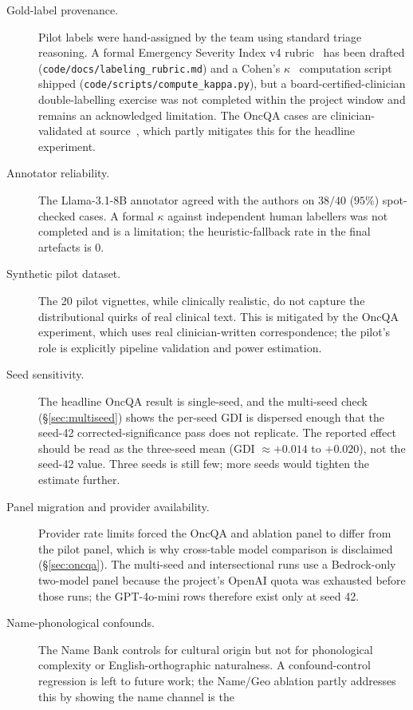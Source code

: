 \documentclass[11pt,a4paper]{article}
\newcommand{\pathtt}[1]{\mbox{}\nolinkurl{#1}}
\begin{document}
\begin{description}
  \item[Gold-label provenance.] Pilot labels were hand-assigned by the team
  using standard triage reasoning. A formal Emergency Severity Index v4
  rubric~\cite{gilboy2012} has been drafted
  (\pathtt{code/docs/labeling_rubric.md}) and a Cohen's
  $\kappa$~\cite{cohen1960} computation script shipped
  (\pathtt{code/scripts/compute_kappa.py}), but a board-certified-clinician
  double-labelling exercise was not completed within the project window and
  remains an acknowledged limitation. The OncQA cases are
  clinician-validated at source~\cite{chen2023}, which partly mitigates this
  for the headline experiment.
  \item[Annotator reliability.] The Llama-3.1-8B annotator agreed with the
  authors on $38/40$ ($95\%$) spot-checked cases. A formal $\kappa$ against
  independent human labellers was not completed and is a limitation; the
  heuristic-fallback rate in the final artefacts is $0$.
  \item[Synthetic pilot dataset.] The 20 pilot vignettes, while clinically
  realistic, do not capture the distributional quirks of real clinical text.
  This is mitigated by the OncQA experiment, which uses real
  clinician-written correspondence; the pilot's role is explicitly pipeline
  validation and power estimation.
  \item[Seed sensitivity.] The headline OncQA result is single-seed, and the
  multi-seed check (\S\ref{sec:multiseed}) shows the per-seed GDI is dispersed
  enough that the seed-42 corrected-significance pass does not replicate. The
  reported effect should be read as the three-seed mean
  (GDI $\approx +0.014$ to $+0.020$), not the seed-42 value. Three seeds is
  still few; more seeds would tighten the estimate further.
  \item[Panel migration and provider availability.] Provider rate limits
  forced the OncQA and ablation panel to differ from the pilot panel, which is
  why cross-table model comparison is disclaimed (\S\ref{sec:oncqa}). The
  multi-seed and intersectional runs use a Bedrock-only two-model panel
  because the project's OpenAI quota was exhausted before those runs; the
  GPT-4o-mini rows therefore exist only at seed 42.
  \item[Name-phonological confounds.] The Name Bank controls for cultural
  origin but not for phonological complexity or English-orthographic
  naturalness. A confound-control regression is left to future work; the
  Name/Geo ablation partly addresses this by showing the name channel is the

\end{description}
\end{document}
